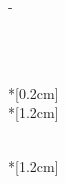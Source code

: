 \thispagestyle{empty}             %
\calccentering{\unitlength}
\begin{adjustwidth*}{\unitlength}{-\unitlength}
    \begin{adjustwidth}{-0.5cm}{-0.5cm}
        \sffamily
        \begin{flushright}
            \tipodoc{}\\
        \end{flushright}
        \vspace*{\fill}
        \noindent
        \HUGE \titulodoc{}\\*[0.2cm]
        \Huge \subtitulodoc{}\\*[1.2cm]
        \parbox[b]{0.5\linewidth}{%
            \LARGE 
            \autordoc{}\\*[1.2cm]
        }
    \end{adjustwidth}
\end{adjustwidth*}
\normalfont
\normalsize